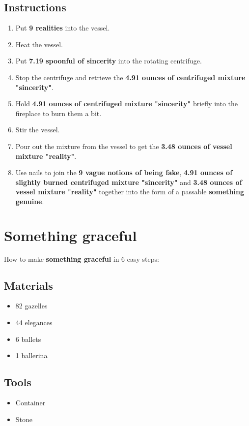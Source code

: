 \documentclass{article}
\begin{document}
\subsection{Instructions}\begin{enumerate}
\item 
Put \textbf{9 realities} into the vessel.
\item 
Heat the vessel.
\item 
Put \textbf{7.19 spoonful of sincerity} into the rotating centrifuge.
\item 
Stop the centrifuge and retrieve the \textbf{4.91 ounces of centrifuged mixture "sincerity"}.
\item 
Hold \textbf{4.91 ounces of centrifuged mixture "sincerity"} briefly into the fireplace to burn them a bit.
\item 
Stir the vessel.
\item 
Pour out the mixture from the vessel to get the \textbf{3.48 ounces of vessel mixture "reality"}.
\item 
Use nails to join the \textbf{9 vague notions of being fake}, \textbf{4.91 ounces of slightly burned centrifuged mixture "sincerity"} and \textbf{3.48 ounces of vessel mixture "reality"} together into the form of a passable \textbf{something genuine}.
\end{enumerate}
\newpage
\section{Something graceful}How to make \textbf{something graceful} in 6 easy steps:

\subsection{Materials}\begin{itemize}
\item 
82 gazelles
\item 
44 elegances
\item 
6 ballets
\item 
1 ballerina
\end{itemize}
\subsection{Tools}\begin{itemize}
\item 
Container
\item 
Stone
\end{itemize}
\end{document}
